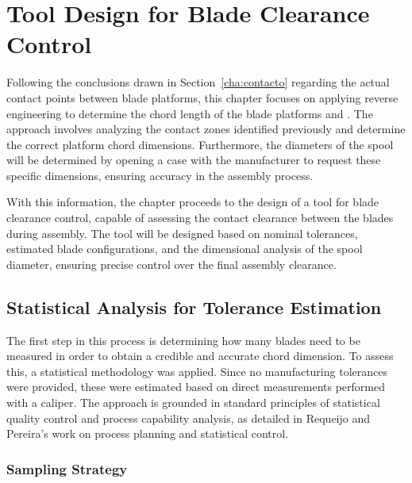 
%

\chapter{Tool Design for Blade Clearance Control}
\label{cha:toolclear}


Following the conclusions drawn in Section~\ref{cha:contacto} regarding the actual contact points between blade platforms, this chapter focuses on applying reverse engineering to determine the chord length of the blade platforms and . The approach involves analyzing the contact zones identified previously and determine the correct platform chord dimensions. Furthermore, the diameters of the spool will be determined by opening a case with the manufacturer to request these specific dimensions, ensuring accuracy in the assembly process.

With this information, the chapter proceeds to the design of a tool for blade clearance control, capable of assessing the contact clearance between the blades during assembly. The tool will be designed based on nominal tolerances, estimated blade configurations, and the dimensional analysis of the spool diameter, ensuring precise control over the final assembly clearance.


\section{Statistical Analysis for Tolerance Estimation}

The first step in this process is determining how many blades need to be measured in order to obtain a credible and accurate chord dimension. 
To assess this, a statistical methodology was applied. Since no manufacturing tolerances were provided, these were estimated based on direct measurements performed with a caliper. 
The approach is grounded in standard principles of statistical quality control and process capability analysis, as detailed in Requeijo and Pereira's work on process planning and statistical control.

\subsection{Sampling Strategy}

